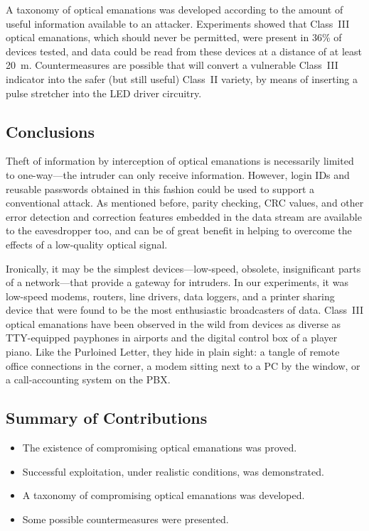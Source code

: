 \documentclass{acmtrans2e}
\begin{document}
A taxonomy of optical emanations was developed according to the amount 
of useful information available to an attacker.  Experiments showed 
that Class~III optical emanations, which should never be permitted, were 
present in 36\% of devices tested, and data could be read from these 
devices at a distance of at least 20~m.  Countermeasures are 
possible that will convert a vulnerable Class~III indicator into the 
safer (but still useful) Class~II variety, by means of inserting a pulse
stretcher into the LED driver circuitry.

\subsection{Conclusions}

Theft of information by interception of optical emanations is necessarily 
limited to one-way---the intruder can only receive information.  
However, login IDs and reusable passwords obtained in this fashion 
could be used to support a conventional attack.  As mentioned before, 
parity checking, CRC values, and other error detection and correction features 
embedded in the data stream are available to the eavesdropper too, and can 
be of great benefit in helping to overcome the effects of a low-quality 
optical signal.

Ironically, it may be the simplest devices---low-speed, 
obsolete, insignificant parts of a network---that provide a gateway 
for intruders.  In our experiments, it was low-speed modems, 
routers, line drivers, data loggers, and a printer sharing device that
were found to be the most enthusiastic broadcasters of data. 
Class~III optical emanations have been observed in the wild from
devices as diverse as TTY-equipped payphones in airports and the
digital control box of a player piano.  Like the Purloined 
Letter, they hide in plain sight: a tangle of 
remote office connections in the corner, a modem sitting next to a PC by 
the window, or a call-accounting system on the PBX.

\subsection{Summary of Contributions}

\begin{itemize}

\item The existence of compromising optical emanations was proved.

\item Successful exploitation, under realistic conditions, was 
demonstrated.

\item A taxonomy of compromising optical emanations was developed.

\item Some possible countermeasures were presented.

\end{itemize}
\end{document}
